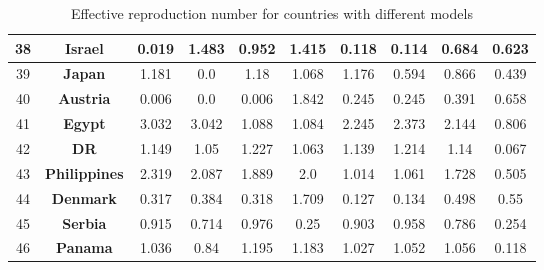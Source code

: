 \begin{table*}
\begin{center}
\begin{tiny}
\begin{tabular}{|c|c|c|c|c|c|c|c|c|c|}
38 & {\bf Israel} & 0.019 & 1.483 & 0.952 & 1.415 & 0.118 & 0.114 & 0.684 & 0.623\\ \hline
39 & {\bf Japan} & 1.181 & 0.0 & 1.18 & 1.068 & 1.176 & 0.594 & 0.866 & 0.439\\ \hline
40 & {\bf Austria} & 0.006 & 0.0 & 0.006 & 1.842 & 0.245 & 0.245 & 0.391 & 0.658\\ \hline
41 & {\bf Egypt} & 3.032 & 3.042 & 1.088 & 1.084 & 2.245 & 2.373 & 2.144 & 0.806\\ \hline
42 & {\bf DR} & 1.149 & 1.05 & 1.227 & 1.063 & 1.139 & 1.214 & 1.14 & 0.067\\ \hline
43 & {\bf Philippines} & 2.319 & 2.087 & 1.889 & 2.0 & 1.014 & 1.061 & 1.728 & 0.505\\ \hline
44 & {\bf Denmark} & 0.317 & 0.384 & 0.318 & 1.709 & 0.127 & 0.134 & 0.498 & 0.55\\ \hline
45 & {\bf Serbia} & 0.915 & 0.714 & 0.976 & 0.25 & 0.903 & 0.958 & 0.786 & 0.254\\ \hline
46 & {\bf Panama} & 1.036 & 0.84 & 1.195 & 1.183 & 1.027 & 1.052 & 1.056 & 0.118\\ \hline
\end{tabular}
\caption{Effective reproduction number \Rt  for countries with different models
}
\label{R0}
\end{tiny}
\end{center}
\end{table*}

